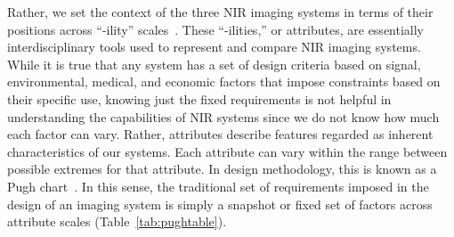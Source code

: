 Rather, we set the context of the three \ac{NIR} imaging systems in terms of their positions across ``-ility'' scales~\cite{DeWeck2012}. These ``-ilities,'' or attributes, are essentially interdisciplinary tools used to represent and compare \ac{NIR} imaging systems. While it is true that any system has a set of design criteria based on signal, environmental, medical, and economic factors that impose constraints based on their specific use, knowing just the fixed requirements is not helpful in understanding the capabilities of \ac{NIR} systems since we do not know how much each factor can vary. Rather, attributes describe features regarded as inherent characteristics of our systems. 
Each attribute can vary within the range between possible extremes for that attribute. In design methodology, this is known as a Pugh chart~\cite{Pugh1981}.  In this sense, the traditional set of requirements imposed in the design of an imaging system is simply a snapshot or fixed set of factors across attribute scales (Table~\ref{tab:pughtable}). 

